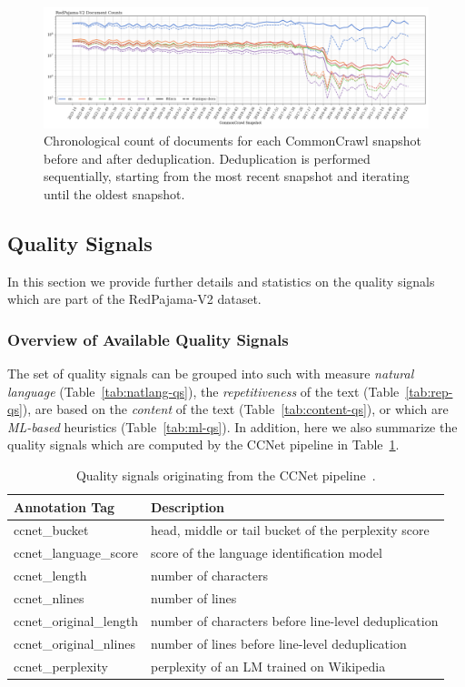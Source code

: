\documentclass{article}
\begin{document}
\begin{figure}[!tbp]
    \centering
    \includegraphics[width=\textwidth]{figures/document_counts.png}
    \caption{Chronological count of documents for each CommonCrawl snapshot before and after deduplication. Deduplication is performed sequentially, starting from the most recent snapshot and iterating until the oldest snapshot.}
    \label{fig:rpv2-deduped-document-counts}
\end{figure}

\subsection{Quality Signals}
\label{sec:apx-quality-signals}
In this section we provide further details and statistics on the quality signals which are part of the RedPajama-V2 dataset.

\subsubsection{Overview of Available Quality Signals}
The set of quality signals can be grouped into such with measure \emph{natural language} (Table~\ref{tab:natlang-qs}), the \emph{repetitiveness} of the text (Table~\ref{tab:rep-qs}), are based on the \emph{content} of the text (Table~\ref{tab:content-qs}), or which are \emph{ML-based} heuristics (Table~\ref{tab:ml-qs}). In addition, here we also summarize the quality signals which are computed by the CCNet pipeline in Table~\ref{tab:ccnet-qs}.



\begin{table}
\centering
\caption{Quality signals originating from the CCNet pipeline~\cite{wenzek2019ccnet}.}
\begin{tabular}{l l}
\toprule
Annotation Tag & Description\\
\midrule
ccnet\_bucket & head, middle or tail bucket of the perplexity score\\
\midrule
ccnet\_language\_score & score of the language identification model\\
\midrule
ccnet\_length & number of characters \\
\midrule
ccnet\_nlines & number of lines \\
\midrule
ccnet\_original\_length & number of characters before line-level deduplication \\
\midrule
ccnet\_original\_nlines & number of lines before line-level deduplication \\
\midrule
ccnet\_perplexity & perplexity of an LM trained on Wikipedia \\
\bottomrule
\end{tabular}
\label{tab:ccnet-qs}
\end{table}
\end{document}
